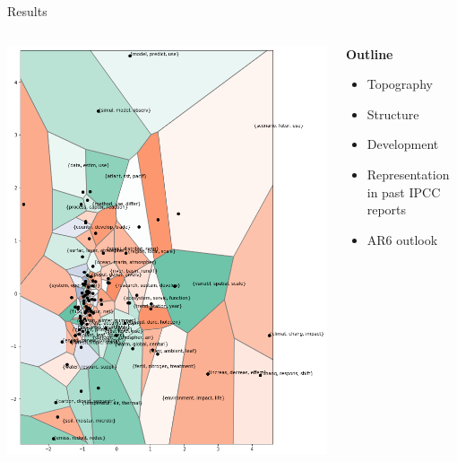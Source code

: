 \documentclass[9pt]{beamer}
\begin{document}
\begin{frame}{Results}

\begin{columns}
	\begin{column}{0.5\linewidth}
		\begin{center}	
			\includegraphics[width=\linewidth]{../plots/pca_map_portrait}
		\end{center}
	\end{column}
	\begin{column}{0.5\linewidth}
		\textbf{Outline}	
		\begin{center}
			\begin{itemize}
				\item<2-> Topography
				\item<3-> Structure
				\item<4-> Development
				\item<5-> Representation in past IPCC reports
				\item<6-> AR6 outlook
			\end{itemize}
		\end{center}
	\end{column}
\end{columns}

\end{frame}
\end{document}
